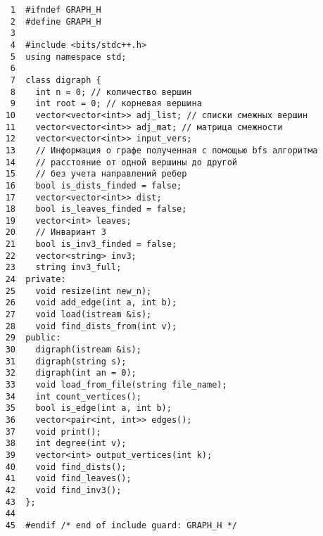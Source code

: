 \begin{verbatim}
     1	#ifndef GRAPH_H
     2	#define GRAPH_H
     3	
     4	#include <bits/stdc++.h>
     5	using namespace std;
     6	
     7	class digraph {
     8	  int n = 0; // количество вершин
     9	  int root = 0; // корневая вершина
    10	  vector<vector<int>> adj_list; // списки смежных вершин
    11	  vector<vector<int>> adj_mat; // матрица смежности
    12	  vector<vector<int>> input_vers;
    13	  // Информация о графе полученная с помощью bfs алгоритма
    14	  // расстояние от одной вершины до другой
    15	  // без учета направлений ребер
    16	  bool is_dists_finded = false;
    17	  vector<vector<int>> dist;
    18	  bool is_leaves_finded = false;
    19	  vector<int> leaves;
    20	  // Инвариант 3
    21	  bool is_inv3_finded = false;
    22	  vector<string> inv3;
    23	  string inv3_full;
    24	private:
    25	  void resize(int new_n);
    26	  void add_edge(int a, int b);
    27	  void load(istream &is);
    28	  void find_dists_from(int v);
    29	public:
    30	  digraph(istream &is);
    31	  digraph(string s);
    32	  digraph(int an = 0);
    33	  void load_from_file(string file_name);
    34	  int count_vertices();
    35	  bool is_edge(int a, int b);
    36	  vector<pair<int, int>> edges();
    37	  void print();
    38	  int degree(int v);
    39	  vector<int> output_vertices(int k);
    40	  void find_dists();
    41	  void find_leaves();
    42	  void find_inv3();
    43	};
    44	
    45	#endif /* end of include guard: GRAPH_H */
\end{verbatim}
